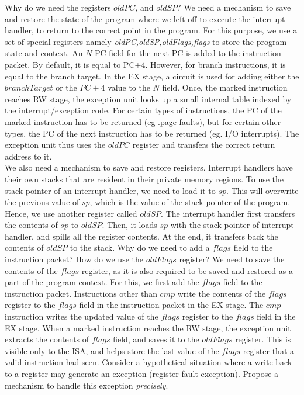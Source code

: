 \begin{ExerciseList}
\Exercise
Why do we need the registers $oldPC$, and $oldSP$?
\Answer
We need a mechanism to save and restore the state of the program where we left off to execute the interrupt handler, to return to the correct point in the program. For this purpose, we use a set of special registers namely \textit{oldPC,oldSP,oldFlags,flags} to store the program state and context. An $N$ PC field for the next PC is added to the instruction packet. By default, it is equal to PC+4. However, for branch instructions, it is equal to the branch target. In the EX stage, a circuit is used for adding either the $branchTarget$ or the $PC+4$ value to the $N$ field. Once, the marked instruction reaches RW stage, the exception unit looks up a small internal table indexed by the interrupt/exception code. For certain types of instructions, the PC of the marked instruction has to be returned (eg .page faults), but for certain other types, the PC of the next instruction has to be returned (eg. I/O interrupts). The exception unit thus uses the $oldPC$ register and transfers the correct return address to it. \\
We also need a mechanism to save and restore registers. Interrupt handlers have their own stacks that are resident in their private memory regions. To use the stack pointer of an interrupt handler, we need to load it to $sp$. This will overwrite the previous value of $sp$, which is the value of the stack pointer of the program. Hence, we use another register called $oldSP$. The interrupt handler first transfers the contents of $sp$ to $oldSP$. Then, it loads $sp$ with the stack pointer of interrupt handler, and spills all the register contents. At the end, it transfers back the contents of $oldSP$ to the stack. 
\Exercise
Why do we need to add a $flags$ field to the instruction packet? How do we use
the $oldFlags$ register?
\Answer
We need to save the contents of the $flags$ register, as it is also required to be saved and restored as a part of the program context. For this, we first add the $flags$ field to the instruction packet. Instructions other than $cmp$ write the contents of the $flags$ register to the $flags$ field in the instruction packet in the EX stage. The $cmp$ instruction writes the updated value of the $flags$ register to the $flags$ field in the EX stage. When a marked instruction reaches the RW stage, the exception unit extracts the contents of $flags$ field, and saves it to the $oldFlags$ register. This is visible only to the ISA, and helps store the last value of the $flags$ register that a valid instruction had seen. 
\Exercise[difficulty=1]
Consider a hypothetical situation where a write back to a register may generate an
exception (register-fault exception). Propose a mechanism to handle this exception
{\em precisely}.


\end{ExerciseList}
